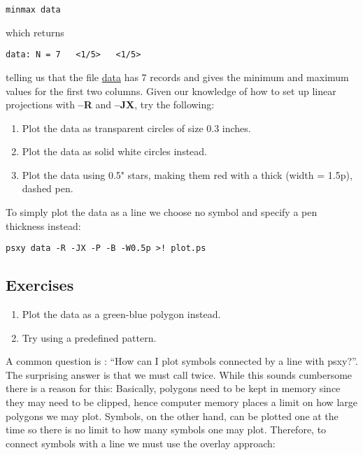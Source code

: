 \documentclass{report}
\makeatletter
\newcommand{\GMTprog}[1]{\htmladdnormallink{{\textsf{\textbf{#1}}}}{../#1.html}\index{#1@{\textsf{\textbf{#1}}}}}
\newcommand{\filename}[1]{\underline{#1}}
\newcommand{\Opt}[1]{{\bf --#1}}%
\newcommand{\Opt}[1]{{\bf -#1}}%
\makeatother
\begin{document}
\begin{verbatim}
minmax data
\end{verbatim} 

\noindent
which returns

\begin{verbatim}
data: N = 7   <1/5>   <1/5>
\end{verbatim} 

\noindent
telling us that the file \filename{data} has 7 records and gives the
minimum and maximum values for the first two columns.  Given our
knowledge of how to set up linear projections with \Opt{R} and \Opt{JX},
try the following:

\begin{enumerate}

\item Plot the data as transparent circles of size 0.3 inches.

\item Plot the data as solid white circles instead.

\item Plot the data using 0.5" stars, making them red with a thick (width = 1.5p),
dashed pen.

\end{enumerate}

To simply plot the data as a line we choose no symbol and specify a pen thickness instead:

\begin{verbatim} 
psxy data -R -JX -P -B -W0.5p >! plot.ps
\end{verbatim} 

\subsection{Exercises}

\begin{enumerate}

\item Plot the data as a green-blue polygon instead.

\item Try using a predefined pattern.

\end{enumerate}

A common question is : ``How can I plot symbols connected by a line
with psxy?''.  The surprising answer is that we must call \GMTprog{psxy} twice.
While this sounds cumbersome there is a reason for this:  Basically,
polygons need to be kept in memory since they may need to be clipped,
hence computer memory places a limit on how large polygons we may plot.
Symbols, on the other hand, can be plotted one at the time so there
is no limit to how many symbols one may plot.  Therefore, to connect
symbols with a line we must use the overlay approach:
\end{document}
